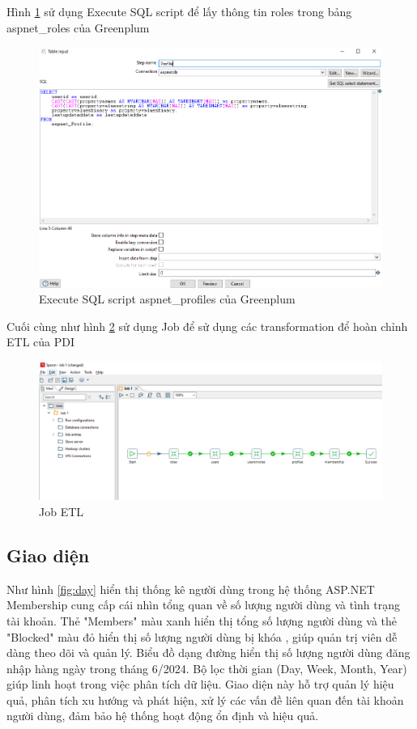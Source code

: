 \documentclass[14pt]{article}
\begin{document}
Hình \ref{fig:gprofiles} sử dụng Execute SQL script để lấy thông tin roles trong bảng aspnet\_roles của Greenplum


\begin{figure}
    \centering
    \includegraphics[width=0.5\linewidth]{images/gprofiles.png}
    \caption{Execute SQL script aspnet\_profiles của Greenplum}
    \label{fig:gprofiles}
\end{figure}


Cuối cùng như hình \ref{fig:job} sử dụng Job để sử dụng các transformation để hoàn chỉnh ETL của PDI


\begin{figure}
    \centering
    \includegraphics[width=0.5\linewidth]{images/job.png}
    \caption{Job ETL}
    \label{fig:job}
\end{figure}



\subsection{Giao diện}



Như hình \ref{fig:day} hiển thị thống kê người dùng trong hệ thống ASP.NET Membership cung cấp cái nhìn tổng quan về số lượng người dùng và tình trạng tài khoản. Thẻ "Members" màu xanh hiển thị tổng số lượng người dùng và thẻ "Blocked" màu đỏ hiển thị số lượng người dùng bị khóa , giúp quản trị viên dễ dàng theo dõi và quản lý. Biểu đồ dạng đường hiển thị số lượng người dùng đăng nhập hàng ngày trong tháng 6/2024. Bộ lọc thời gian (Day, Week, Month, Year) giúp linh hoạt trong việc phân tích dữ liệu. Giao diện này hỗ trợ quản lý hiệu quả, phân tích xu hướng và phát hiện, xử lý các vấn đề liên quan đến tài khoản người dùng, đảm bảo hệ thống hoạt động ổn định và hiệu quả.
\end{document}
